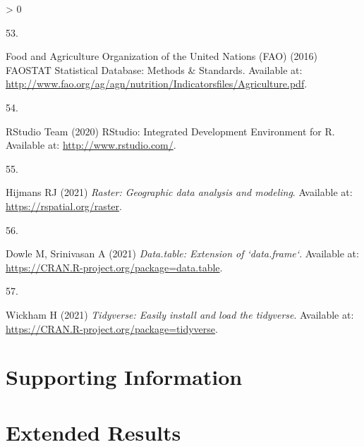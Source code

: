 \documentclass[9pt,twocolumn,twoside,lineno]{pnas-new}
\newlength{\csllabelwidth}
\newlength{\cslhangindent}
\newenvironment{CSLReferences}[2] %
 {%
  \setlength{\parindent}{0pt}
  \ifodd #1 \everypar{\setlength{\hangindent}{\cslhangindent}}\ignorespaces\fi
  \ifnum #2 > 0
  \setlength{\parskip}{#2\baselineskip}
  \fi
 }%
 {}
\newcommand{\CSLLeftMargin}[1]{\parbox[t]{\csllabelwidth}{#1}}
\newcommand{\CSLRightInline}[1]{\parbox[t]{\linewidth - \csllabelwidth}{#1}\break}
\begin{document}
\begin{CSLReferences}{0}{0}
\leavevmode\hypertarget{ref-FAO2016}{}%
\CSLLeftMargin{53. }
\CSLRightInline{Food and Agriculture Organization of the United Nations (FAO) (2016) {FAOSTAT Statistical Database: Methods {\&} Standards}. Available at: \url{http://www.fao.org/ag/agn/nutrition/Indicatorsfiles/Agriculture.pdf}.}

\leavevmode\hypertarget{ref-RStudio}{}%
\CSLLeftMargin{54. }
\CSLRightInline{RStudio Team (2020) {RStudio: Integrated Development Environment for R}. Available at: \url{http://www.rstudio.com/}.}

\leavevmode\hypertarget{ref-R-raster}{}%
\CSLLeftMargin{55. }
\CSLRightInline{Hijmans RJ (2021) \emph{Raster: Geographic data analysis and modeling}. Available at: \url{https://rspatial.org/raster}.}

\leavevmode\hypertarget{ref-R-data.table}{}%
\CSLLeftMargin{56. }
\CSLRightInline{Dowle M, Srinivasan A (2021) \emph{Data.table: Extension of `data.frame`}. Available at: \url{https://CRAN.R-project.org/package=data.table}.}

\leavevmode\hypertarget{ref-R-tidyverse}{}%
\CSLLeftMargin{57. }
\CSLRightInline{Wickham H (2021) \emph{Tidyverse: Easily install and load the tidyverse}. Available at: \url{https://CRAN.R-project.org/package=tidyverse}.}

\end{CSLReferences}

\newpage

\setcounter{figure}{0} \setcounter{section}{0} \setcounter{table}{0} \setcounter{equation}{0} \renewcommand{\thefigure}{S\arabic{figure}} \renewcommand{\thesection}{S\arabic{section}} \renewcommand{\thetable}{S\arabic{table}} \renewcommand\theequation{S\arabic{equation}}

\onecolumn

\hypertarget{supporting-information-1}{%
\section*{Supporting Information}\label{supporting-information-1}}

\tableofcontents
\listoftables
\listoffigures

\newpage

\hypertarget{results-si}{%
\section{Extended Results}\label{results-si}}
\end{document}
